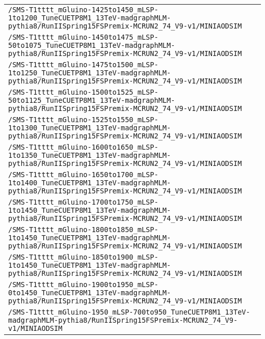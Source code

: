 \begin{center}
\begin{tabular}{l}
\verb!/SMS-T1tttt_mGluino-1425to1450_mLSP-1to1200_TuneCUETP8M1_13TeV-madgraphMLM-pythia8/RunIISpring15FSPremix-MCRUN2_74_V9-v1/MINIAODSIM! \tabularnewline
\verb!/SMS-T1tttt_mGluino-1450to1475_mLSP-50to1075_TuneCUETP8M1_13TeV-madgraphMLM-pythia8/RunIISpring15FSPremix-MCRUN2_74_V9-v1/MINIAODSIM! \tabularnewline
\verb!/SMS-T1tttt_mGluino-1475to1500_mLSP-1to1250_TuneCUETP8M1_13TeV-madgraphMLM-pythia8/RunIISpring15FSPremix-MCRUN2_74_V9-v1/MINIAODSIM! \tabularnewline
\verb!/SMS-T1tttt_mGluino-1500to1525_mLSP-50to1125_TuneCUETP8M1_13TeV-madgraphMLM-pythia8/RunIISpring15FSPremix-MCRUN2_74_V9-v1/MINIAODSIM! \tabularnewline
\verb!/SMS-T1tttt_mGluino-1525to1550_mLSP-1to1300_TuneCUETP8M1_13TeV-madgraphMLM-pythia8/RunIISpring15FSPremix-MCRUN2_74_V9-v1/MINIAODSIM! \tabularnewline
\verb!/SMS-T1tttt_mGluino-1600to1650_mLSP-1to1350_TuneCUETP8M1_13TeV-madgraphMLM-pythia8/RunIISpring15FSPremix-MCRUN2_74_V9-v1/MINIAODSIM! \tabularnewline
\verb!/SMS-T1tttt_mGluino-1650to1700_mLSP-1to1400_TuneCUETP8M1_13TeV-madgraphMLM-pythia8/RunIISpring15FSPremix-MCRUN2_74_V9-v1/MINIAODSIM! \tabularnewline
\verb!/SMS-T1tttt_mGluino-1700to1750_mLSP-1to1450_TuneCUETP8M1_13TeV-madgraphMLM-pythia8/RunIISpring15FSPremix-MCRUN2_74_V9-v1/MINIAODSIM! \tabularnewline
\verb!/SMS-T1tttt_mGluino-1800to1850_mLSP-1to1450_TuneCUETP8M1_13TeV-madgraphMLM-pythia8/RunIISpring15FSPremix-MCRUN2_74_V9-v1/MINIAODSIM! \tabularnewline
\verb!/SMS-T1tttt_mGluino-1850to1900_mLSP-1to1450_TuneCUETP8M1_13TeV-madgraphMLM-pythia8/RunIISpring15FSPremix-MCRUN2_74_V9-v1/MINIAODSIM! \tabularnewline
\verb!/SMS-T1tttt_mGluino-1900to1950_mLSP-0to1450_TuneCUETP8M1_13TeV-madgraphMLM-pythia8/RunIISpring15FSPremix-MCRUN2_74_V9-v1/MINIAODSIM! \tabularnewline
\verb!/SMS-T1tttt_mGluino-1950_mLSP-700to950_TuneCUETP8M1_13TeV-madgraphMLM-pythia8/RunIISpring15FSPremix-MCRUN2_74_V9-v1/MINIAODSIM! \tabularnewline
\hline
\end{tabular}\end{center}
